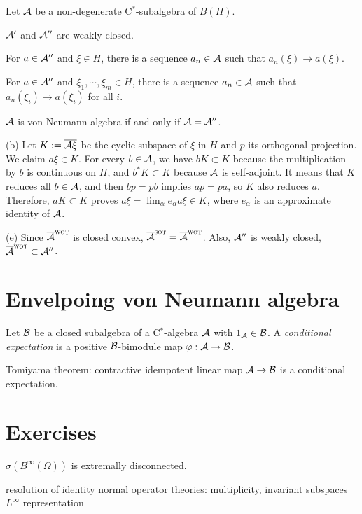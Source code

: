 \documentclass{../../large}
\newcommand{\wot}{{\text{\sc wot}}}
\newcommand{\sot}{{\text{\sc sot}}}
\begin{document}
\begin{prb}
Let $\mathcal{A}$ be a non-degenerate C$^*$-subalgebra of $B(H)$.
\begin{parts}
\item $\mathcal{A}'$ and $\mathcal{A}''$ are weakly closed.
\item For $a\in\mathcal{A}''$ and $\xi\in H$, there is a sequence $a_n\in\mathcal{A}$ such that $a_n(\xi)\to a(\xi)$.
\item For $a\in\mathcal{A}''$ and $\xi_1,\cdots,\xi_m\in H$, there is a sequence $a_n\in\mathcal{A}$ such that $a_n(\xi_i)\to a(\xi_i)$ for all $i$.
\item $\mathcal{A}$ is von Neumann algebra if and only if $\mathcal{A}=\mathcal{A}''$.
\end{parts}
\end{prb}
\begin{pf}
(b)
Let $K:=\overline{\mathcal{A}\xi}$ be the cyclic subspace of $\xi$ in $H$ and $p$ its orthogonal projection.
We claim $a\xi\in K$.
For every $b\in\mathcal{A}$, we have $bK\subset K$ because the multiplication by $b$ is continuous on $H$, and $b^*K\subset K$ because $\mathcal{A}$ is self-adjoint.
It means that $K$ reduces all $b\in\mathcal{A}$, and then $bp=pb$ implies $ap=pa$, so $K$ also reduces $a$.
Therefore, $aK\subset K$ proves $a\xi=\lim_\alpha e_\alpha a\xi\in K$, where $e_\alpha$ is an approximate identity of $\mathcal{A}$.

(e)
Since $\bar\cA^\wot$ is closed convex, $\bar\cA^\sot=\bar\cA^\wot$.
Also, $\mathcal{A}''$ is weakly closed, $\bar\cA^\wot\subset\cA''$.
\end{pf}


\begin{prb}
\end{prb}



\section{Envelpoing von Neumann algebra}
\begin{prb}
\end{prb}
\begin{prb}
Let $\mathcal{B}$ be a closed subalgebra of a C$^*$-algebra $\mathcal{A}$ with $1_{\mathcal{A}}\in\mathcal{B}$.
A \emph{conditional expectation} is a positive $\mathcal{B}$-bimodule map $\varphi:\mathcal{A}\to\mathcal{B}$.
\begin{parts}
\item
\item Tomiyama theorem: contractive idempotent linear map $\mathcal{A}\to\mathcal{B}$ is a conditional expectation.
\end{parts}
\end{prb}
\begin{prb}
\end{prb}


\section*{Exercises}
\begin{prb}
$\sigma(B^\infty(\Omega))$ is extremally disconnected.
\end{prb}

resolution of identity
normal operator theories: multiplicity, invariant subspaces
$L^\infty$ representation
\end{document}
